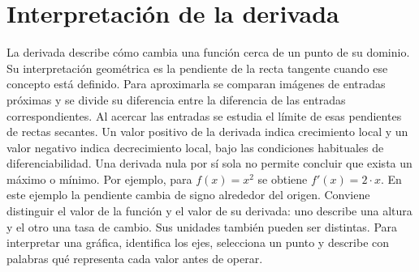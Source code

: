 \section{Interpretación de la derivada}
La derivada describe cómo cambia una función cerca de un punto de su dominio.
Su interpretación geométrica es la pendiente de la recta tangente cuando ese
concepto está definido. Para aproximarla se comparan imágenes de entradas próximas
y se divide su diferencia entre la diferencia de las entradas correspondientes.
Al acercar las entradas se estudia el límite de esas pendientes de rectas secantes.
Un valor positivo de la derivada indica crecimiento local y un valor negativo
indica decrecimiento local, bajo las condiciones habituales de diferenciabilidad.
Una derivada nula por sí sola no permite concluir que exista un máximo o mínimo.
Por ejemplo, para $f(x)=x^{2}$ se obtiene $f'(x)=2\cdot x$.
En este ejemplo la pendiente cambia de signo alrededor del origen.
Conviene distinguir el valor de la función y el valor de su derivada:
uno describe una altura y el otro una tasa de cambio. Sus unidades también
pueden ser distintas. Para interpretar una gráfica, identifica los ejes, selecciona
un punto y describe con palabras qué representa cada valor antes de operar.
